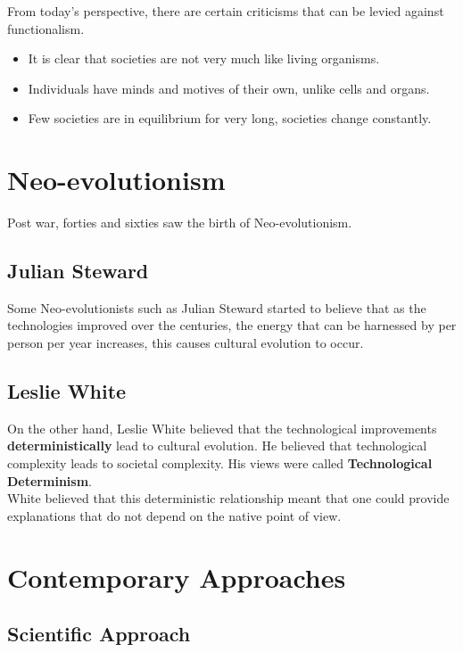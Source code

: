 \documentclass[11pt,a4paper]{book}
\begin{document}
From today's perspective, there are certain criticisms that can be levied against functionalism.

\begin{itemize}
\item It is clear that societies are not very much like living organisms.
\item Individuals have minds and motives of their own, unlike cells and organs.
\item Few societies are in equilibrium for very long, societies change constantly.
\end{itemize}

\section{Neo-evolutionism}

Post war, forties and sixties saw the birth of Neo-evolutionism.

\subsection{Julian Steward}

Some Neo-evolutionists such as Julian Steward  started to believe that as the technologies improved over the centuries, the energy that can be harnessed by per person per year increases, this causes cultural evolution to occur.

\subsection{Leslie White}

On the other hand, Leslie White believed that the technological improvements \textbf{deterministically} lead to cultural evolution. He believed that technological complexity leads to societal complexity. His views were called \textbf{Technological Determinism}.\\

White believed that this deterministic relationship meant that one could provide explanations that do not depend on the native point of view.\\

\section{Contemporary Approaches}

\subsection{Scientific Approach}
\end{document}

